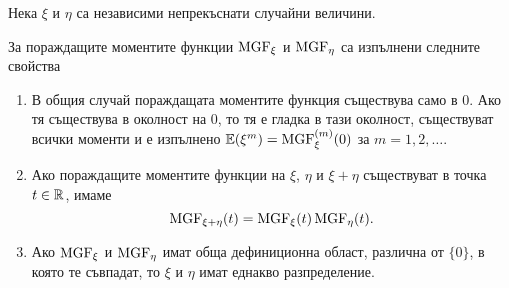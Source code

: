 \documentclass[numbers=endperiod, DIV=15, bibliography=totocnumbered]{scrartcl}
\begin{document}
\begin{theorem}\label{thm:mgf-props}
  Нека $\xi$ и $\eta$ са независими непрекъснати случайни величини.

  За пораждащите моментите функции $\operatorname{MGF}_\xi$ и $\operatorname{MGF}_\eta$ са изпълнени следните свойства
  \begin{enumerate}
    \item В общия случай пораждащата моментите функция съществува само в $0$. Ако тя съществува в околност на $0$, то тя е гладка в тази околност, съществуват всички моменти и е изпълнено $\mathbb{E}(\xi^m) = \operatorname{MGF}_\xi^{(m)} (0)$ за $m = 1, 2, \ldots$.

    \item Ако пораждащите моментите функции на $\xi$, $\eta$ и $\xi + \eta$ съществуват в точка $t \in \mathbb{R}$, имаме
    \begin{displaymath}
      \operatorname{MGF}_{\xi + \eta}(t) = \operatorname{MGF}_\xi(t) \operatorname{MGF}_\eta(t).
    \end{displaymath}

    \item Ако $\operatorname{MGF}_\xi$ и $\operatorname{MGF}_\eta$ имат обща дефиниционна област, различна от $\{ 0 \}$, в която те съвпадат, то $\xi$ и $\eta$ имат еднакво разпределение.
  \end{enumerate}
\end{theorem}
\end{document}
